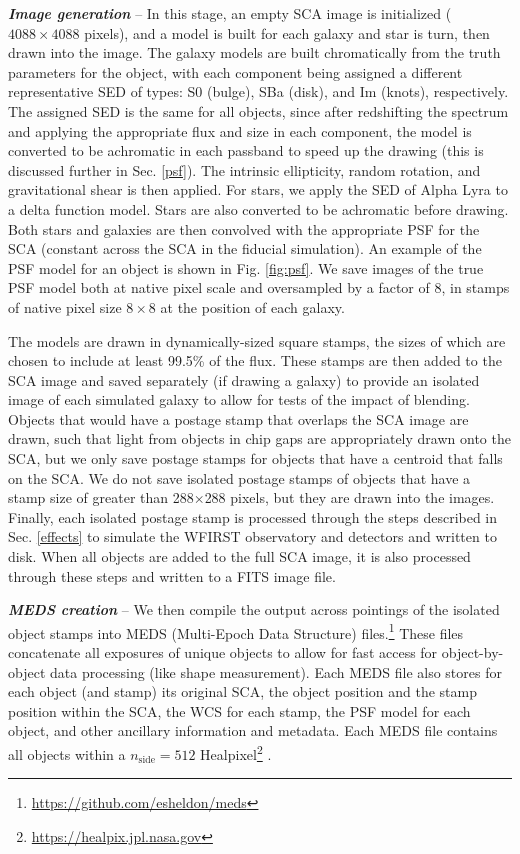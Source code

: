 \documentclass[aps,prd, amsmath,amssymb,superscriptaddress,showkeys,nofootinbib,reprint,preprintnumbers]{revtex4-1}
\begin{document}
\textbf{\textit{Image generation}} -- In this stage, an empty SCA image is initialized ($4088\times4088$ pixels), and a model is built for each galaxy and star is turn, then drawn into the image. 
The galaxy models are built chromatically from the truth parameters for the object, with each component being assigned a different representative SED of types: S0 (bulge), SBa (disk), and Im (knots), respectively. 
The assigned SED is the same for all objects, since after redshifting the spectrum and applying the appropriate flux and size in each component, the model is converted to be achromatic in each passband to speed up the drawing (this is discussed further in Sec. \ref{psf}). 
The intrinsic ellipticity, random rotation, and gravitational shear is then applied.
For stars, we apply the SED of Alpha Lyra to a delta function model. 
Stars are also converted to be achromatic before drawing.
Both stars and galaxies are then convolved with the appropriate PSF for the SCA (constant across the SCA in the fiducial simulation). An example of the PSF model for an object is shown in Fig. \ref{fig:psf}. We save images of the true PSF model both at native pixel scale and oversampled by a factor of 8, in stamps of native pixel size $8\times 8$ at the position of each galaxy.

The models are drawn in dynamically-sized square stamps, the sizes of which are chosen to include at least 99.5\% of the flux.
These stamps are then added to the SCA image and saved separately (if drawing a galaxy) to provide an isolated image of each simulated galaxy to allow for tests of the impact of blending.
Objects that would have a postage stamp that overlaps the SCA image are drawn, such that light from objects in chip gaps are appropriately drawn onto the SCA, but we only save postage stamps for objects that have a centroid that falls on the SCA. 
We do not save isolated postage stamps of objects that have a stamp size of greater than 288$\times$288 pixels, but they are drawn into the images.
Finally, each isolated postage stamp is processed through the steps described in Sec. \ref{effects} to simulate the WFIRST observatory and detectors and written to disk. When all objects are added to the full SCA image, it is also processed through these steps and written to a FITS image file.

\textbf{\textit{MEDS creation}} -- We then compile the output across pointings of the isolated object stamps into MEDS (Multi-Epoch Data Structure) files.\footnote{\url{https://github.com/esheldon/meds}}
These files concatenate all exposures of unique objects to allow for fast access for object-by-object data processing (like shape measurement). 
Each MEDS file also stores for each object (and stamp) its original SCA, the object position and the stamp position within the SCA, the WCS for each stamp, the PSF model for each object, and other ancillary information and metadata.
Each MEDS file contains all objects within a $n_{\textrm{side}}=512$ Healpixel\footnote{\url{https://healpix.jpl.nasa.gov}} \cite{2005ApJ...622..759G,Zonca2019}.
\end{document}

